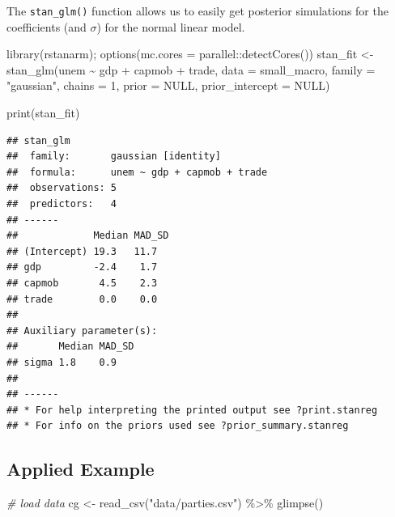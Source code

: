 \documentclass[
]{book}
\newenvironment{Shaded}{\begin{snugshade}}{\end{snugshade}}
\newcommand{\AttributeTok}[1]{\textcolor[rgb]{0.77,0.63,0.00}{#1}}
\newcommand{\CommentTok}[1]{\textcolor[rgb]{0.56,0.35,0.01}{\textit{#1}}}
\newcommand{\ConstantTok}[1]{\textcolor[rgb]{0.00,0.00,0.00}{#1}}
\newcommand{\DecValTok}[1]{\textcolor[rgb]{0.00,0.00,0.81}{#1}}
\newcommand{\FunctionTok}[1]{\textcolor[rgb]{0.00,0.00,0.00}{#1}}
\newcommand{\NormalTok}[1]{#1}
\newcommand{\OtherTok}[1]{\textcolor[rgb]{0.56,0.35,0.01}{#1}}
\newcommand{\SpecialCharTok}[1]{\textcolor[rgb]{0.00,0.00,0.00}{#1}}
\newcommand{\StringTok}[1]{\textcolor[rgb]{0.31,0.60,0.02}{#1}}
\begin{document}
The \texttt{stan\_glm()} function allows us to easily get posterior simulations for the coefficients (and \(\sigma\)) for the normal linear model.

\begin{Shaded}
\begin{Highlighting}[]
\FunctionTok{library}\NormalTok{(rstanarm); }\FunctionTok{options}\NormalTok{(}\AttributeTok{mc.cores =}\NormalTok{ parallel}\SpecialCharTok{::}\FunctionTok{detectCores}\NormalTok{())}
\NormalTok{stan\_fit }\OtherTok{\textless{}{-}} \FunctionTok{stan\_glm}\NormalTok{(unem }\SpecialCharTok{\textasciitilde{}}\NormalTok{ gdp }\SpecialCharTok{+}\NormalTok{ capmob }\SpecialCharTok{+}\NormalTok{ trade, }\AttributeTok{data =}\NormalTok{ small\_macro, }
                     \AttributeTok{family =} \StringTok{"gaussian"}\NormalTok{, }
                     \AttributeTok{chains =} \DecValTok{1}\NormalTok{, }
                     \AttributeTok{prior =} \ConstantTok{NULL}\NormalTok{,}
                     \AttributeTok{prior\_intercept =} \ConstantTok{NULL}\NormalTok{)}
\end{Highlighting}
\end{Shaded}

\begin{Shaded}
\begin{Highlighting}[]
\FunctionTok{print}\NormalTok{(stan\_fit)}
\end{Highlighting}
\end{Shaded}

\begin{verbatim}
## stan_glm
##  family:       gaussian [identity]
##  formula:      unem ~ gdp + capmob + trade
##  observations: 5
##  predictors:   4
## ------
##             Median MAD_SD
## (Intercept) 19.3   11.7  
## gdp         -2.4    1.7  
## capmob       4.5    2.3  
## trade        0.0    0.0  
## 
## Auxiliary parameter(s):
##       Median MAD_SD
## sigma 1.8    0.9   
## 
## ------
## * For help interpreting the printed output see ?print.stanreg
## * For info on the priors used see ?prior_summary.stanreg
\end{verbatim}

\hypertarget{applied-example}{%
\subsection{Applied Example}\label{applied-example}}

\begin{Shaded}
\begin{Highlighting}[]
\CommentTok{\# load data}
\NormalTok{cg }\OtherTok{\textless{}{-}} \FunctionTok{read\_csv}\NormalTok{(}\StringTok{"data/parties.csv"}\NormalTok{) }\SpecialCharTok{\%\textgreater{}\%}
  \FunctionTok{glimpse}\NormalTok{()}
\end{Highlighting}
\end{Shaded}
\end{document}
